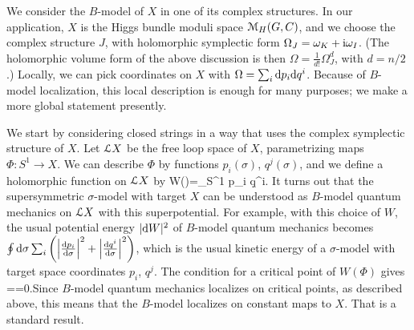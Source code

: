 \documentclass[11pt,a4paper]{article}
\begin{document}
We consider the $B$-model  of $X$ in one of its complex structures.
In our application, $X$ is the Higgs bundle moduli space ${\mathcal M}_H(G,C)$, and we choose
the complex structure $J$, with holomorphic symplectic form $\Omega_J=\omega_K+{\mathrm i}\omega_I$.   (The holomorphic volume form of the above
discussion is then $\varOmega=\frac{1}{d!}\Omega_J^d$, with $d=n/2$.)   
Locally, we can pick coordinates on $X$ with $\Omega=\sum_i \mathrm d p_i \mathrm d q^i$.  Because of $B$-model localization, this local description is enough
for many purposes; we make a more global statement presently.

We start by considering closed strings in a way that uses the complex symplectic structure of $X$.
Let ${\mathcal L} X$ be the free loop space of $X$, parametrizing maps $\Phi:S^1\to X$.
We can describe $\Phi$ by functions $p_i(\sigma)$, $q^j(\sigma)$, and we define a holomorphic function on ${\mathcal L} X$ by
\be\label{knon} W(\Phi)=\oint_{S^1} p_i \d q^i. \ee  
It turns out that the supersymmetric $\sigma$-model with target $X$ can be understood as $B$-model quantum mechanics on ${\mathcal L} X$ with this
superpotential.   For example, with this choice of $W$, the usual potential energy $|\mathrm d W|^2$ of $B$-model 
quantum mechanics becomes $\oint\mathrm d\sigma \sum_i\left(\left|\frac{\mathrm d p_i}{\mathrm d \sigma}\right|^2
+\left|\frac{\mathrm d q^i}{\mathrm d \sigma}\right|^2\right)$, which is the usual kinetic energy of a $\sigma$-model with target space coordinates $p_i$, $ q^j$.   The condition
for a critical point of $W(\Phi)$ gives
\be\label{nonj}==0.\ee  Since  $B$-model quantum mechanics localizes on critical points, as described above, this
means that the $B$-model localizes on constant maps to $X$.  That is a standard result.
\end{document}
